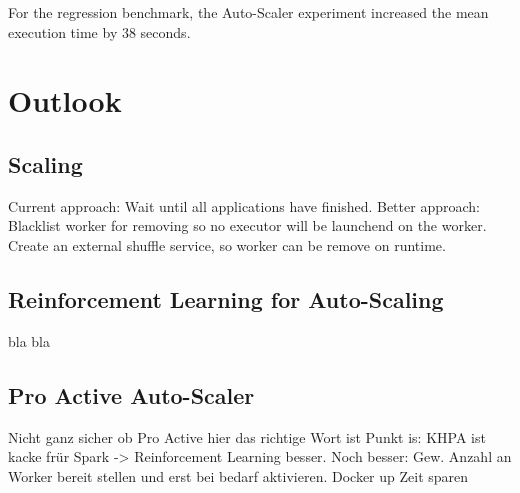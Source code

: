 For the regression benchmark, the Auto-Scaler experiment increased the mean execution time by 38 seconds.


\section{Outlook}


\subsection{Scaling}
Current approach: Wait until all applications have finished.
Better approach: Blacklist worker for removing so no executor will be launchend on the worker.
Create an external shuffle service, so worker can be remove on runtime.


\subsection{Reinforcement Learning for Auto-Scaling}
bla bla


\subsection{Pro Active Auto-Scaler}
Nicht ganz sicher ob Pro Active hier das richtige Wort ist
Punkt is: KHPA ist kacke frür Spark -> Reinforcement Learning besser.
Noch besser: Gew. Anzahl an Worker bereit stellen und erst bei bedarf aktivieren. Docker up Zeit sparen
